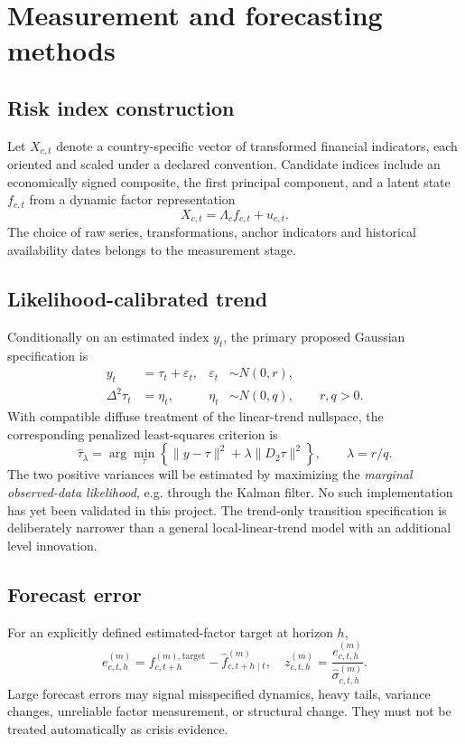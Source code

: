 \section{Measurement and forecasting methods}
\subsection{Risk index construction}
Let \(X_{c,t}\) denote a country-specific vector of
transformed financial indicators, each oriented and scaled under
a declared convention. Candidate indices include an economically
signed composite, the first principal component, and a latent state
\(f_{c,t}\) from a dynamic factor representation
\begin{equation}
X_{c,t}=\Lambda_c f_{c,t}+u_{c,t}.
\end{equation}
The choice of raw series, transformations, anchor indicators and
historical availability dates belongs to the measurement stage.

\subsection{Likelihood-calibrated trend}
Conditionally on an estimated index \(y_t\), the primary proposed
Gaussian specification is
\begin{align}
y_t &= \tau_t+\varepsilon_t,
&\varepsilon_t&\sim N(0,r),\\
\Delta^2\tau_t &= \eta_t,
&\eta_t&\sim N(0,q),\qquad r,q>0.
\end{align}
With compatible diffuse treatment of the linear-trend nullspace,
the corresponding penalized least-squares criterion is
\begin{equation}
\widehat{\tau}_{\lambda} =
\arg\min_{\tau}
\left\{ \|y-\tau\|^2+
\lambda\|D_2\tau\|^2\right\},
\qquad \lambda=r/q.
\end{equation}
The two positive variances will be estimated by maximizing
the \emph{marginal observed-data likelihood}, e.g. through the Kalman
filter. No such implementation has yet been validated in this project.
The trend-only transition specification is deliberately narrower than
a general local-linear-trend model with an additional level innovation.

\subsection{Forecast error}
For an explicitly defined estimated-factor target at horizon \(h\),
\begin{equation}
e_{c,t,h}^{(m)} =
f_{c,t+h}^{(m),\mathrm{target}} -
\widehat f_{c,t+h\mid t}^{(m)},
\quad
z_{c,t,h}^{(m)}=
\frac{e_{c,t,h}^{(m)}}{\widehat\sigma_{c,t,h}^{(m)}}.
\end{equation}
Large forecast errors may signal misspecified dynamics, heavy tails,
variance changes, unreliable factor measurement, or structural change.
They must not be treated automatically as crisis evidence.
